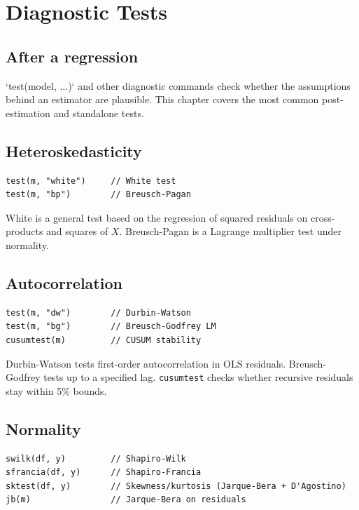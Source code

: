 \chapter{Diagnostic Tests}

\section{After a regression}

`test(model, ...)` and other diagnostic commands check whether the
assumptions behind an estimator are plausible. This chapter covers the
most common post-estimation and standalone tests.

\section{Heteroskedasticity}

\begin{lstlisting}[caption={White and Breusch-Pagan tests}]
test(m, "white")     // White test
test(m, "bp")        // Breusch-Pagan
\end{lstlisting}

White is a general test based on the regression of squared residuals on
cross-products and squares of $X$. Breusch-Pagan is a Lagrange
multiplier test under normality.

\section{Autocorrelation}

\begin{lstlisting}[caption={Autocorrelation tests}]
test(m, "dw")        // Durbin-Watson
test(m, "bg")        // Breusch-Godfrey LM
cusumtest(m)         // CUSUM stability
\end{lstlisting}

Durbin-Watson tests first-order autocorrelation in OLS residuals.
Breusch-Godfrey tests up to a specified lag. \texttt{cusumtest} checks whether
recursive residuals stay within 5\% bounds.

\section{Normality}

\begin{lstlisting}[caption={Normality tests}]
swilk(df, y)         // Shapiro-Wilk
sfrancia(df, y)      // Shapiro-Francia
sktest(df, y)        // Skewness/kurtosis (Jarque-Bera + D'Agostino)
jb(m)                // Jarque-Bera on residuals
\end{lstlisting}

